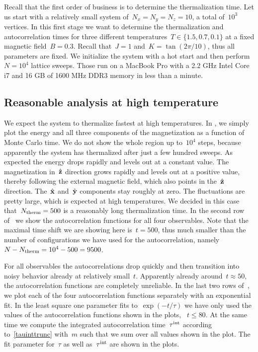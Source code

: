 Recall that the first order of business is to determine the thermalization time.
Let us start with a relatively small system of~$N_x = N_y = N_z = 10$, \ie{} a
total of~$10^3$ vertices. In this first stage we want to determine the
thermalization and autocorrelation times for three different temperatures~$T \in
\{1.5, 0.7, 0.1\}$ at a fixed magnetic field~$B=0.3$. Recall that~$J=1$
and~$K=\tan(2 \pi / 10)$, thus all parameters are fixed. We initialize the
system with a hot start and then perform~$N=10^4$ lattice sweeps. Those run on
a MacBook Pro with a 2.2 GHz Intel Core i7 and 16 GB of 1600 MHz DDR3 memory in
less than a minute.

\subsection{Reasonable analysis at high temperature}

We expect the system to thermalize fastest at high temperatures. In
, we simply plot the energy and all three components of the
magnetization as a function of Monte Carlo time. We do not show the whole region
up to~$10^4$ steps, because apparently the system has thermalized after just a
few hundred sweeps. As expected the energy drops rapidly and levels out at a
constant value. The magnetization in~$\hat{\mathbf{z}}$ direction grows rapidly and levels
out at a positive value, thereby following the external magnetic field, which
also points in the~$\hat{\mathbf{z}}$ direction. The~$\hat{\mathbf{x}}$ and~$\hat{\mathbf{y}}$ components stay roughly
at zero. The fluctuations are pretty large, which is expected at high
temperatures. We decided in this case that~$N_{\mathrm{therm}} = 500$ is a reasonably long
thermalization time. In the second row of~ we show the
autocorrelation functions for all four observables. Note that the maximal time
shift we are showing here is~$t = 500$, thus much smaller than the number of
configurations we have used for the autocorrelation, namely~$N - N_{\mathrm{therm}} = 10^4
- 500 = 9500$.

For all observables the autocorrelations drop quickly and then transition into
noisy behavior already at relatively small~$t$. Apparently already around~$t
\approx 50$, the autocorrelation functions are completely unreliable. In the
last two rows of~, we plot each of the four autocorrelation
functions separately with an exponential fit. In the least square one parameter
fits to~$\exp(-t/\tau)$ we have only used the values of the autocorrelation
functions shown in the plots, \ie{}~$t \le 80$. At the same time we compute the
integrated autocorrelation time~$\tau^{\mathrm{int}}$ according to~\eqref{tauinttrunc}
with~$m$ such that we sum over all values shown in the plot. The fit parameter
for~$\tau$ as well as~$\tau^{\mathrm{int}}$ are shown in the plots.

